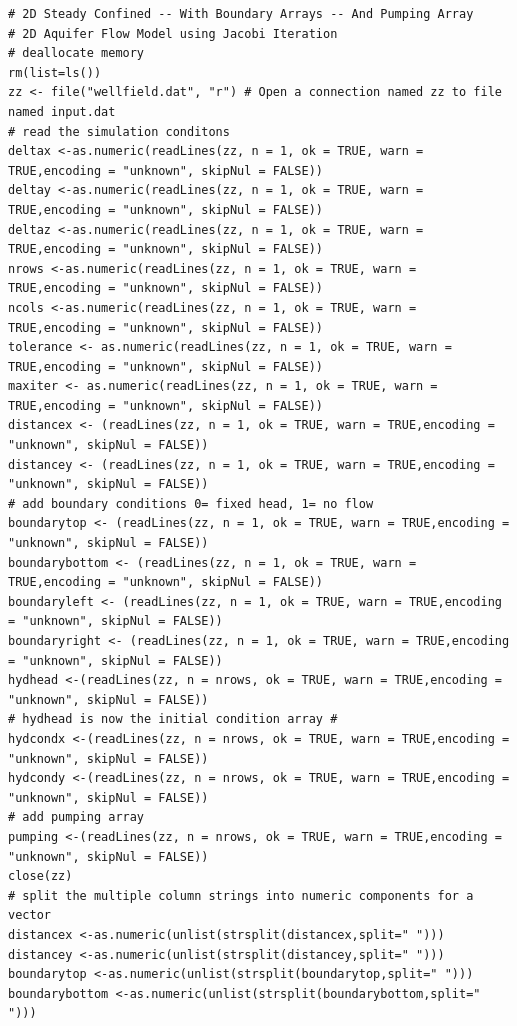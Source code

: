 \begin{lstlisting}[caption= Input file for 2D Steady flow with generalized boundary conditions and wells , label=lst:AddWellsFrags]
# 2D Steady Confined -- With Boundary Arrays -- And Pumping Array
# 2D Aquifer Flow Model using Jacobi Iteration
# deallocate memory
rm(list=ls())
zz <- file("wellfield.dat", "r") # Open a connection named zz to file named input.dat
# read the simulation conditons
deltax <-as.numeric(readLines(zz, n = 1, ok = TRUE, warn = TRUE,encoding = "unknown", skipNul = FALSE))
deltay <-as.numeric(readLines(zz, n = 1, ok = TRUE, warn = TRUE,encoding = "unknown", skipNul = FALSE))
deltaz <-as.numeric(readLines(zz, n = 1, ok = TRUE, warn = TRUE,encoding = "unknown", skipNul = FALSE))
nrows <-as.numeric(readLines(zz, n = 1, ok = TRUE, warn = TRUE,encoding = "unknown", skipNul = FALSE))
ncols <-as.numeric(readLines(zz, n = 1, ok = TRUE, warn = TRUE,encoding = "unknown", skipNul = FALSE))
tolerance <- as.numeric(readLines(zz, n = 1, ok = TRUE, warn = TRUE,encoding = "unknown", skipNul = FALSE))
maxiter <- as.numeric(readLines(zz, n = 1, ok = TRUE, warn = TRUE,encoding = "unknown", skipNul = FALSE))
distancex <- (readLines(zz, n = 1, ok = TRUE, warn = TRUE,encoding = "unknown", skipNul = FALSE))
distancey <- (readLines(zz, n = 1, ok = TRUE, warn = TRUE,encoding = "unknown", skipNul = FALSE))
# add boundary conditions 0= fixed head, 1= no flow
boundarytop <- (readLines(zz, n = 1, ok = TRUE, warn = TRUE,encoding = "unknown", skipNul = FALSE))
boundarybottom <- (readLines(zz, n = 1, ok = TRUE, warn = TRUE,encoding = "unknown", skipNul = FALSE))
boundaryleft <- (readLines(zz, n = 1, ok = TRUE, warn = TRUE,encoding = "unknown", skipNul = FALSE))
boundaryright <- (readLines(zz, n = 1, ok = TRUE, warn = TRUE,encoding = "unknown", skipNul = FALSE))
hydhead <-(readLines(zz, n = nrows, ok = TRUE, warn = TRUE,encoding = "unknown", skipNul = FALSE))
# hydhead is now the initial condition array #
hydcondx <-(readLines(zz, n = nrows, ok = TRUE, warn = TRUE,encoding = "unknown", skipNul = FALSE))
hydcondy <-(readLines(zz, n = nrows, ok = TRUE, warn = TRUE,encoding = "unknown", skipNul = FALSE))
# add pumping array
pumping <-(readLines(zz, n = nrows, ok = TRUE, warn = TRUE,encoding = "unknown", skipNul = FALSE))
close(zz)
# split the multiple column strings into numeric components for a vector
distancex <-as.numeric(unlist(strsplit(distancex,split=" ")))
distancey <-as.numeric(unlist(strsplit(distancey,split=" ")))
boundarytop <-as.numeric(unlist(strsplit(boundarytop,split=" ")))
boundarybottom <-as.numeric(unlist(strsplit(boundarybottom,split=" ")))

\end{lstlisting}
